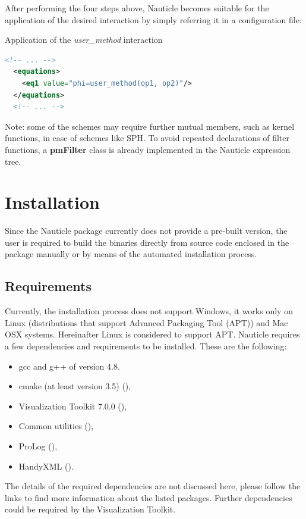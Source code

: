 \documentclass[a4paper,12pt,openany]{book}
\newcommand{\myhref}[3][nauticlegreen_dark]{\href{#2}{\color{#1}{#3}}}%
\theoremstyle{break}
\begin{document}
After performing the four steps above, Nauticle becomes suitable for the application of the desired interaction by simply referring it in a configuration file:
\begin{example}{Application of the \textit{user\_method} interaction}{}
\lstset{basicstyle=\tiny}
\begin{lstlisting}[language=XML]
  <!-- ... -->
  <equations>
    <eq1 value="phi=user_method(op1, op2)"/>
  </equations>
  <!-- ... -->
\end{lstlisting}
\end{example}

Note: some of the schemes may require further mutual members, such as kernel functions, in case of schemes like SPH. To avoid repeated declarations of filter functions, a \textbf{pmFilter} class is already implemented in the Nauticle expression tree.


\section{Installation}
Since the Nauticle package currently does not provide a pre-built version, the user is required to build the binaries directly from source code enclosed in the package manually or by means of the automated installation process.
\subsection{Requirements}
Currently, the installation process does not support Windows, it works only on Linux (distributions that support Advanced Packaging Tool (APT)) and Mac OSX systems. Hereinafter Linux is considered to support APT.
Nauticle requires a few dependencies and requirements to be installed. These are the following:
\begin{itemize}
  \item gcc and g++ of version 4.8.
  \item cmake (at least version 3.5) (\myhref{https://cmake.org/download/}{https://cmake.org/download/}),
  \item Visualization Toolkit 7.0.0 (\myhref{http://www.vtk.org/files/release/7.0/VTK-7.0.0.zip}{http://www.vtk.org/files/release/7.0/VTK-7.0.0.zip}),
  \item Common utilities (\myhref{https://bitbucket.org/BalazsToth/commonutils}{https://bitbucket.org/BalazsToth/commonutils}),
  \item ProLog (\myhref{https://bitbucket.org/BalazsToth/prolog}{https://bitbucket.org/BalazsToth/prolog}),
  \item HandyXML (\myhref{https://bitbucket.org/BalazsToth/handyxml}{https://bitbucket.org/BalazsToth/handyxml}).
\end{itemize}
The details of the required dependencies are not discussed here, please follow the links to find more information about the listed packages. Further dependencies could be required by the Visualization Toolkit.
\end{document}
